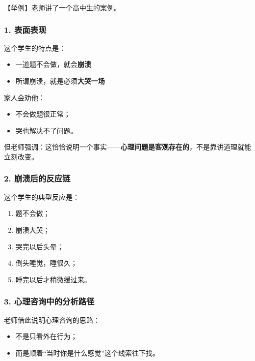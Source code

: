 \documentclass[
  chinese,
  9pt,
  a4paper,
]{ctexart}
\providecommand{\tightlist}{%
  \setlength{\itemsep}{0pt}\setlength{\parskip}{0pt}}
\begin{document}
【举例】老师讲了一个高中生的案例。

\subsubsection{1. 表面表现}\label{ux8868ux9762ux8868ux73b0}

这个学生的特点是：

\begin{itemize}
\tightlist
\item
  一道题不会做，就会\textbf{崩溃}
\item
  所谓崩溃，就是必须\textbf{大哭一场}
\end{itemize}

家人会劝他：

\begin{itemize}
\tightlist
\item
  不会做题很正常；
\item
  哭也解决不了问题。
\end{itemize}

但老师强调：这恰恰说明一个事实------\textbf{心理问题是客观存在的}，不是靠讲道理就能立刻改变。

\subsubsection{2.
崩溃后的反应链}\label{ux5d29ux6e83ux540eux7684ux53cdux5e94ux94fe}

这个学生的典型反应是：

\begin{enumerate}
\def\labelenumi{\arabic{enumi}.}
\tightlist
\item
  题不会做；
\item
  崩溃大哭；
\item
  哭完以后头晕；
\item
  倒头睡觉，睡很久；
\item
  睡完以后才稍微缓过来。
\end{enumerate}

\subsubsection{3.
心理咨询中的分析路径}\label{ux5fc3ux7406ux54a8ux8be2ux4e2dux7684ux5206ux6790ux8defux5f84}

老师借此说明心理咨询的思路：

\begin{itemize}
\tightlist
\item
  不是只看外在行为；
\item
  而是顺着``当时你是什么感觉''这个线索往下找。
\end{itemize}
\end{document}
